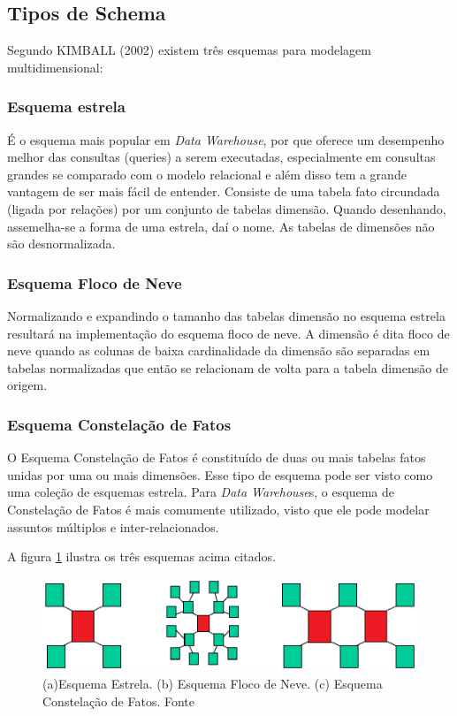 \subsection{Tipos de Schema}
Segundo KIMBALL (2002) existem três esquemas para modelagem multidimensional:

\subsubsection{Esquema estrela}
É o esquema mais popular em \textit{Data Warehouse}, por que oferece um desempenho melhor das consultas (queries) a serem executadas, especialmente em consultas grandes se comparado com o modelo relacional e além disso tem a grande vantagem de ser mais fácil de entender.
Consiste de uma tabela fato circundada (ligada por relações) por um conjunto de tabelas dimensão. Quando desenhando, assemelha-se a forma de uma estrela, daí o nome. As tabelas de dimensões não são desnormalizada. \cite{redbooks}

\subsubsection{Esquema Floco de Neve}
Normalizando e expandindo o tamanho das tabelas dimensão no esquema estrela resultará na implementação do esquema floco de neve. A dimensão é dita floco de neve quando as colunas de baixa cardinalidade da dimensão são separadas em tabelas normalizadas que então se relacionam de volta para a tabela dimensão de origem. \cite{redbooks}

\subsubsection{Esquema Constelação de Fatos}
O Esquema Constelação de Fatos é constituído de duas ou mais tabelas fatos unidas por uma ou mais dimensões. Esse tipo de esquema pode ser visto como uma coleção de esquemas estrela. \cite{redbooks} Para \textit{Data Warehouse}s, o esquema de Constelação de Fatos é mais comumente utilizado, visto que ele pode modelar assuntos múltiplos e inter-relacionados. \cite{gouveia2009}

A figura \ref{tresesquemas} ilustra os três esquemas acima citados.

\begin{figure}[!htb]
	\centering
		\includegraphics{figuras/tresesquemas.eps}
		\caption{(a)Esquema Estrela. (b) Esquema Floco de Neve. (c) Esquema Constelação de Fatos. Fonte \cite{redbooks}}
		\label{tresesquemas}
\end{figure}

